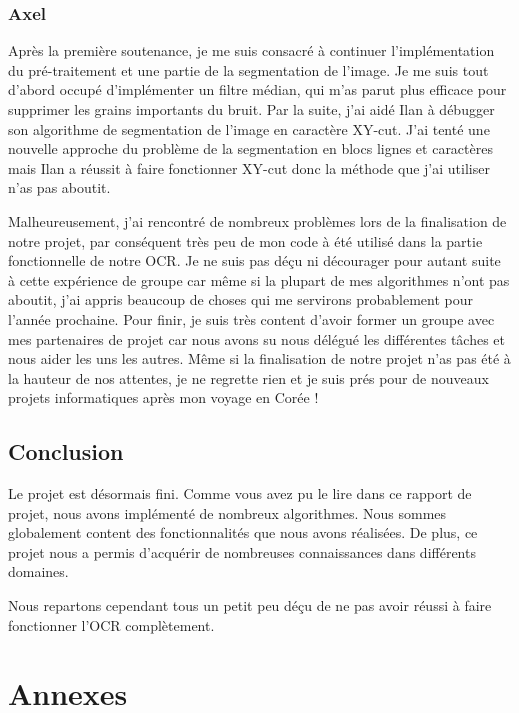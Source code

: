 \documentclass[11pt]{report}
\begin{document}
\section{Axel}

Après la première soutenance, je me suis consacré à continuer l'implémentation du pré-traitement et une partie de la segmentation de l'image.
Je me suis tout d'abord occupé d’implémenter un filtre médian, qui m'as parut plus efficace pour supprimer les grains importants du bruit.
Par la suite, j'ai aidé Ilan à débugger son algorithme de segmentation de l'image en caractère XY-cut. 
J'ai tenté une nouvelle approche du problème de la segmentation en blocs lignes et caractères mais Ilan a réussit à faire fonctionner XY-cut donc la méthode que j'ai utiliser n'as pas aboutit.

Malheureusement, j'ai rencontré de nombreux problèmes lors de la finalisation de notre projet, par conséquent très peu de mon code à été utilisé dans la partie fonctionnelle de notre OCR.
Je ne suis pas déçu ni décourager pour autant suite à cette expérience de groupe car même si la plupart de mes algorithmes n'ont pas aboutit, j'ai appris beaucoup de choses qui me servirons probablement pour l'année prochaine.
Pour finir, je suis très content d'avoir former un groupe avec mes partenaires de projet car nous avons su nous délégué les différentes tâches et nous aider les uns les autres.
Même si la finalisation de notre projet n'as pas été à la hauteur de nos attentes, je ne regrette rien et je suis prés pour de nouveaux projets informatiques après mon voyage en Corée !

\chapter{Conclusion}

Le projet est désormais fini. Comme vous avez pu le lire dans ce rapport de projet, nous avons implémenté de nombreux algorithmes. Nous sommes globalement content des fonctionnalités que nous avons réalisées. De plus, ce projet nous a permis d'acquérir de nombreuses connaissances dans différents domaines.

Nous repartons cependant tous un petit peu déçu de ne pas avoir réussi à faire fonctionner l'OCR complètement.

\newpage
{}
\part*{Annexes}

\newpage
\listoffigures
 
\end{document}
